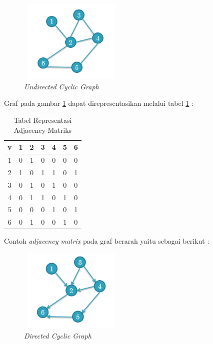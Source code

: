 \begin{figure} [H]
		\centering  
		\includegraphics[width=5cm, height=4cm]{adjacencymatrix} 
		\caption[\textit{Undirected Cyclic Graph}]{\textit{Undirected Cyclic Graph}}
		\label{fig:GambarAM} 
	\end{figure}


Graf pada gambar \ref{fig:GambarAM} dapat direpresentasikan melalui tabel \ref{tabelAM} :


\begin{table}[H]
\centering
\caption{Tabel Representasi Adjacency Matriks}
\begin{tabular}{|c|c|c|c|c|c|c|}
\hline
v & 1 & 2 & 3 & 4 & 5 & 6 \\
\hline
1 & 0 & 1 & 0 & 0 & 0 & 0 \\
\hline
2 & 1 & 0 & 1 & 1 & 0 & 1 \\
\hline
3 & 0 & 1 & 0 & 1 & 0 & 0 \\
\hline
4 & 0 & 1 & 1 & 0 & 1 & 0 \\
\hline
5 & 0 & 0 & 0 & 1 & 0 & 1 \\
\hline
6 & 0 & 1 & 0 & 0 & 1 & 0 \\
\hline
\end{tabular}
\label{tabelAM}
\end{table}

Contoh \textit{adjacency matrix} pada graf berarah yaitu sebagai berikut :

\begin{figure} [H]
		\centering  
		\includegraphics[width=5cm, height=4cm]{graf3} 
		\caption[\textit{Directed Cyclic Graph}]{\textit{Directed Cyclic Graph}}
		\label{fig:GambarDCG} 
	\end{figure}
	
